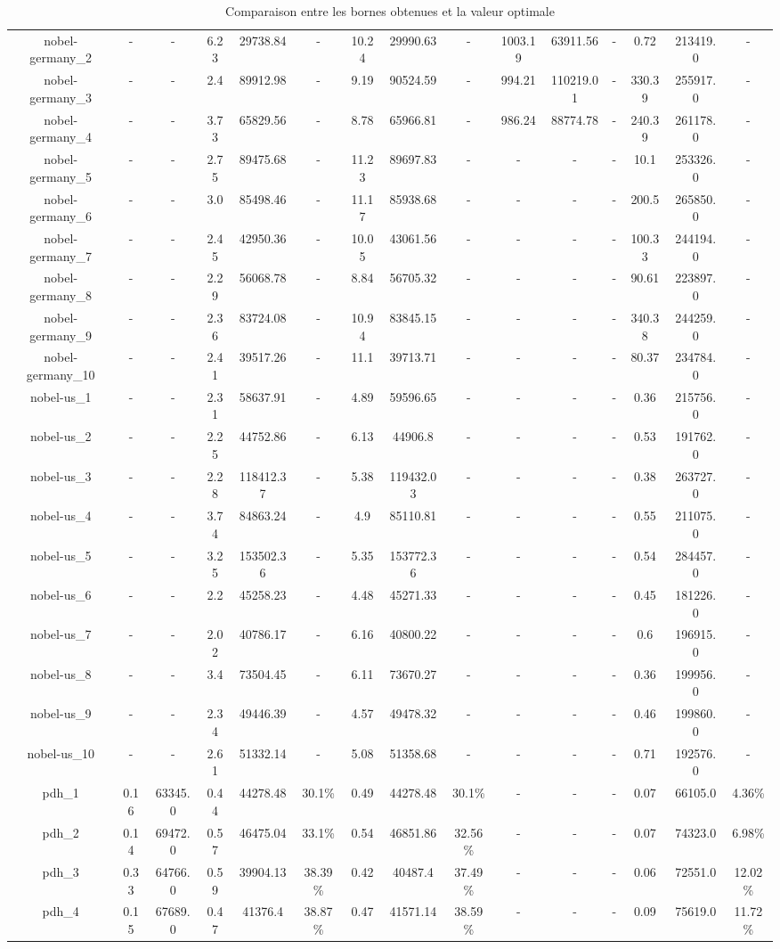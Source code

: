 \documentclass[main.tex]{subfiles}
\begin{document}
\begin{landscape}
\begin{table}[h]
\begin{tabular}{c|cc|ccc|ccc|ccc|ccc}
	nobel-germany\_2 &- &- &6.23 &29738.84 &- &10.24 &29990.63 &- &1003.19 &63911.56 &- &0.72 &213419.0 &-\\
	nobel-germany\_3 &- &- &2.4 &89912.98 &- &9.19 &90524.59 &- &994.21 &110219.01 &- &330.39 &255917.0 &-\\
	nobel-germany\_4 &- &- &3.73 &65829.56 &- &8.78 &65966.81 &- &986.24 &88774.78 &- &240.39 &261178.0 &-\\
	nobel-germany\_5 &- &- &2.75 &89475.68 &- &11.23 &89697.83 &- &- &- &- &10.1 &253326.0 &-\\
	nobel-germany\_6 &- &- &3.0 &85498.46 &- &11.17 &85938.68 &- &- &- &- &200.5 &265850.0 &-\\
	nobel-germany\_7 &- &- &2.45 &42950.36 &- &10.05 &43061.56 &- &- &- &- &100.33 &244194.0 &-\\
	nobel-germany\_8 &- &- &2.29 &56068.78 &- &8.84 &56705.32 &- &- &- &- &90.61 &223897.0 &-\\
	nobel-germany\_9 &- &- &2.36 &83724.08 &- &10.94 &83845.15 &- &- &- &- &340.38 &244259.0 &-\\
	nobel-germany\_10 &- &- &2.41 &39517.26 &- &11.1 &39713.71 &- &- &- &- &80.37 &234784.0 &-\\
	nobel-us\_1 &- &- &2.31 &58637.91 &- &4.89 &59596.65 &- &- &- &- &0.36 &215756.0 &-\\
	nobel-us\_2 &- &- &2.25 &44752.86 &- &6.13 &44906.8 &- &- &- &- &0.53 &191762.0 &-\\
	nobel-us\_3 &- &- &2.28 &118412.37 &- &5.38 &119432.03 &- &- &- &- &0.38 &263727.0 &-\\
	nobel-us\_4 &- &- &3.74 &84863.24 &- &4.9 &85110.81 &- &- &- &- &0.55 &211075.0 &-\\
	nobel-us\_5 &- &- &3.25 &153502.36 &- &5.35 &153772.36 &- &- &- &- &0.54 &284457.0 &-\\
	nobel-us\_6 &- &- &2.2 &45258.23 &- &4.48 &45271.33 &- &- &- &- &0.45 &181226.0 &-\\
	nobel-us\_7 &- &- &2.02 &40786.17 &- &6.16 &40800.22 &- &- &- &- &0.6 &196915.0 &-\\
	nobel-us\_8 &- &- &3.4 &73504.45 &- &6.11 &73670.27 &- &- &- &- &0.36 &199956.0 &-\\
	nobel-us\_9 &- &- &2.34 &49446.39 &- &4.57 &49478.32 &- &- &- &- &0.46 &199860.0 &-\\
	nobel-us\_10 &- &- &2.61 &51332.14 &- &5.08 &51358.68 &- &- &- &- &0.71 &192576.0 &-\\
	pdh\_1 &0.16 &63345.0 &0.44 &44278.48 &30.1\% &0.49 &44278.48 &30.1\% &- &- &- &0.07 &66105.0 &4.36\%\\
	pdh\_2 &0.14 &69472.0 &0.57 &46475.04 &33.1\% &0.54 &46851.86 &32.56\% &- &- &- &0.07 &74323.0 &6.98\%\\
	pdh\_3 &0.33 &64766.0 &0.59 &39904.13 &38.39\% &0.42 &40487.4 &37.49\% &- &- &- &0.06 &72551.0 &12.02\%\\
	pdh\_4 &0.15 &67689.0 &0.47 &41376.4 &38.87\% &0.47 &41571.14 &38.59\% &- &- &- &0.09 &75619.0 &11.72\%\\
\end{tabular}\caption{Comparaison entre les bornes obtenues et la valeur optimale}
\end{table}
\end{landscape}
\end{document}
